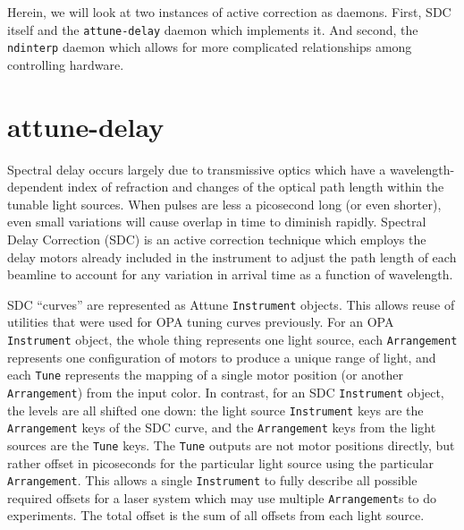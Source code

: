 Herein, we will look at two instances of active correction as daemons.
First, SDC itself and the \texttt{attune-delay} daemon which implements it.
And second, the \texttt{ndinterp} daemon which allows for more complicated relationships among controlling hardware.

\clearpage

\section{attune-delay}  %

Spectral delay occurs largely due to transmissive optics which have a wavelength-dependent index of refraction and changes of the optical path length within the tunable light sources.
When pulses are less a picosecond long (or even shorter), even small variations will cause overlap in time to diminish rapidly.
Spectral Delay Correction (SDC) is an active correction technique which employs the delay motors already included in the instrument to adjust the path length of each beamline to account for any variation in arrival time as a function of wavelength.

SDC ``curves'' are represented as Attune \texttt{Instrument} objects.
This allows reuse of utilities that were used for OPA tuning curves previously.
For an OPA \texttt{Instrument} object, the whole thing represents one light source, each \texttt{Arrangement} represents one configuration of motors to produce a unique range of light, and each \texttt{Tune} represents the mapping of a single motor position (or another \texttt{Arrangement}) from the input color.
In contrast, for an SDC \texttt{Instrument} object, the levels are all shifted one down: the light source \texttt{Instrument} keys are the \texttt{Arrangement} keys of the SDC curve, and the \texttt{Arrangement} keys from the light sources are the \texttt{Tune} keys.
The \texttt{Tune} outputs are not motor positions directly, but rather offset in picoseconds for the particular light source using the particular \texttt{Arrangement}.
This allows a single \texttt{Instrument} to fully describe all possible required offsets for a laser system which may use multiple \texttt{Arrangement}s to do experiments.
The total offset is the sum of all offsets from each light source.

